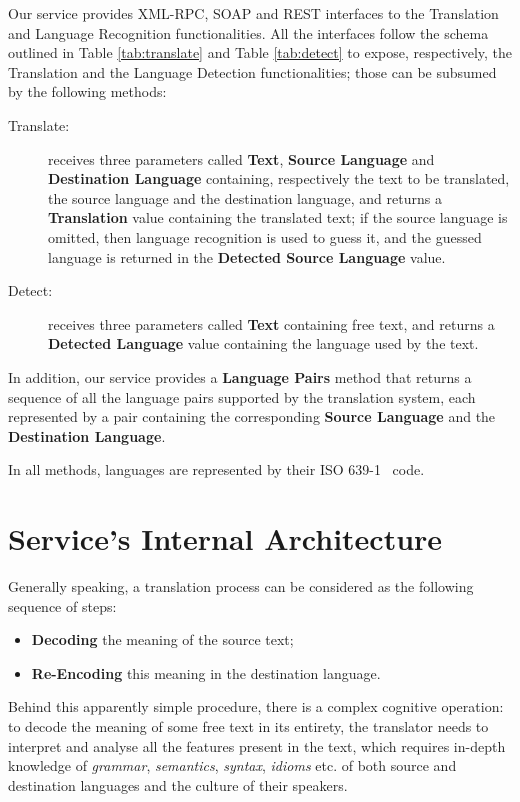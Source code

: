 \documentclass[11pt]{article}
\begin{document}
Our service provides XML-RPC, SOAP and REST interfaces to the Translation and Language Recognition functionalities. All the interfaces follow the schema outlined in Table \ref{tab:translate} and Table \ref{tab:detect} to expose, respectively, the Translation and the Language Detection functionalities; those can be subsumed by the following methods:

\begin{description}
 \item[Translate:] receives three parameters called {\bf Text}, {\bf Source Language} and {\bf Destination Language} containing, respectively the text to be translated, the source language and the destination language, and returns a {\bf Translation} value containing the translated text; if the source language is omitted, then language recognition is used to guess it, and the guessed language is returned in the {\bf Detected Source Language} value.
 \item[Detect:] receives three parameters called {\bf Text} containing free text, and returns a {\bf Detected Language} value containing the language used by the text.
\end{description}

In addition, our service provides a {\bf Language Pairs} method that returns a sequence of all the language pairs supported by the translation system, each represented by a pair containing the corresponding {\bf Source Language} and the {\bf Destination Language}.

In all methods, languages are represented by their ISO 639-1~\citep{ISO:639-1} code.


\section{Service's Internal Architecture}

Generally speaking, a translation process can be considered as the following sequence of steps:

\begin{itemize}
 \item {\bf Decoding} the meaning of the source text;
 \item {\bf Re-Encoding} this meaning in the destination language.
\end{itemize}

Behind this apparently simple procedure, there is a complex cognitive operation: to decode the meaning of some free text in its entirety, the translator needs to interpret and analyse all the features present in the text, which requires in-depth knowledge of \emph{grammar}, \emph{semantics}, \emph{syntax}, \emph{idioms} etc. of both source and destination languages and the culture of their speakers.
\end{document}
